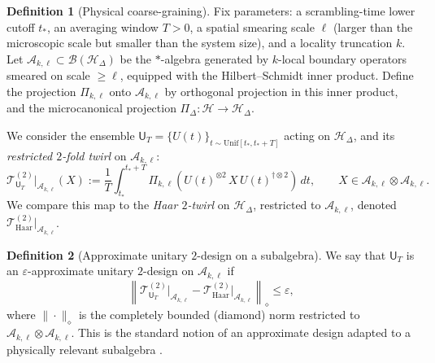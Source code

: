 \documentclass[a4paper,11pt]{article}
\let\mathscr\mathcal
\theoremstyle{plain}
\theoremstyle{definition}
\newtheorem{definition}{Definition}
\theoremstyle{remark}
\begin{document}
\begin{definition}[Physical coarse-graining]\label{def:CG}
Fix parameters: a scrambling-time lower cutoff $t_\ast$, an averaging window $T>0$, a spatial smearing scale $\ell$ (larger than the microscopic scale but smaller than the system size), and a locality truncation $k$.  Let $\mathscr{A}_{k,\ell}\subset \mathcal{B}(\mathcal{H}_\Delta)$ be the $*$-algebra generated by $k$-local boundary operators smeared on scale $\ge \ell$, equipped with the Hilbert--Schmidt inner product.  Define the projection $\Pi_{k,\ell}$ onto $\mathscr{A}_{k,\ell}$ by orthogonal projection in this inner product, and the microcanonical projection $\Pi_\Delta:\mathcal{H}\to\mathcal{H}_\Delta$.

We consider the ensemble $\mathsf{U}_{T}=\{U(t)\}_{t\sim \mathrm{Unif}[t_\ast,t_\ast+T]}$ acting on $\mathcal{H}_\Delta$, and its {\em restricted $2$-fold twirl} on $\mathscr{A}_{k,\ell}$:
\begin{equation}
  \mathcal{T}^{(2)}_{\mathsf{U}_T}\big|_{\mathscr{A}_{k,\ell}}(X)
  := \frac{1}{T}\int_{t_\ast}^{t_\ast+T}
   \Pi_{k,\ell}\!\left(U(t)^{\otimes 2}\, X \, U(t)^{\dagger\otimes 2}\right)\,dt,
  \qquad X\in \mathscr{A}_{k,\ell}\otimes \mathscr{A}_{k,\ell}.
\end{equation}
We compare this map to the {\em Haar $2$-twirl} on $\mathcal{H}_\Delta$, restricted to $\mathscr{A}_{k,\ell}$, denoted $\mathcal{T}^{(2)}_{\mathrm{Haar}}\big|_{\mathscr{A}_{k,\ell}}$.
\end{definition}

\begin{definition}[Approximate unitary $2$-design on a subalgebra]
We say that $\mathsf{U}_{T}$ is an $\varepsilon$-approximate unitary $2$-design on $\mathscr{A}_{k,\ell}$ if
\begin{equation}
 \left\| \mathcal{T}^{(2)}_{\mathsf{U}_T}\big|_{\mathscr{A}_{k,\ell}} - \mathcal{T}^{(2)}_{\mathrm{Haar}}\big|_{\mathscr{A}_{k,\ell}} \right\|_{\diamond} \le \varepsilon,
\end{equation}
where $\|\cdot\|_\diamond$ is the completely bounded (diamond) norm restricted to $\mathscr{A}_{k,\ell}\otimes\mathscr{A}_{k,\ell}$.  This is the standard notion of an approximate design adapted to a physically relevant subalgebra \cite{BrandaoHarrowHorodecki2016,RobertsYoshida2017}.
\end{definition}
\end{document}
